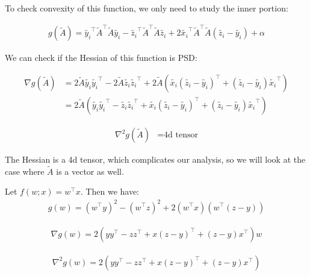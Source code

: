 \documentclass[11pt]{article}
\begin{document}
To check convexity of this function, we only need to study the inner portion:

\begin{equation}
\begin{aligned}
g(\tilde{A}) = \tilde{y_i}^\top\tilde{A}^\top\tilde{A}\tilde{y_i} - \tilde{z_i}^\top\tilde{A}^\top\tilde{A}\tilde{z_i} + 2\tilde{x_i}^\top\tilde{A}^\top\tilde{A}(\tilde{z_i} - \tilde{y_i}) + \alpha
\end{aligned}
\end{equation}

We can check if the Hessian of this function is PSD:

\begin{align*}
\nabla{g(\tilde{A})}
&= 2\tilde{A}\tilde{y_i}\tilde{y_i}^\top - 2\tilde{A}\tilde{z_i}\tilde{z_i}^\top + 2\tilde{A}(\tilde{x_i}(\tilde{z_i} - \tilde{y_i})^\top + (\tilde{z_i} - \tilde{y_i})\tilde{x_i}^\top) \\
&= 2\tilde{A}(\tilde{y_i}\tilde{y_i}^\top - \tilde{z_i}\tilde{z_i}^\top + \tilde{x_i}(\tilde{z_i} - \tilde{y_i})^\top + (\tilde{z_i} - \tilde{y_i})\tilde{x_i}^\top)
\end{align*}

\begin{equation}
\begin{aligned}
\nabla^2 g(\tilde{A})
&= \textrm{4d tensor}
\end{aligned}
\end{equation}

The Hessian is a 4d tensor, which complicates our analysis, so we will look at the case where $\tilde{A}$ is a vector as well. 

Let $f(w; x) = w^{\top}x$. Then we have:
\begin{equation}
\begin{aligned}
g(w) = (w^{\top}y)^2 - (w^{\top}z)^2 + 2(w^{\top}x)(w^{\top}(z - y))
\end{aligned}
\end{equation}

\begin{equation}
\begin{aligned}
\nabla g(w) = 2(yy^{\top} - zz^{\top} + x(z - y)^{\top} + (z - y)x^{\top})w
\end{aligned}
\end{equation}

\begin{equation}
\begin{aligned}
\nabla^2 g(w) = 2(yy^{\top} - zz^{\top} + x(z - y)^{\top} + (z - y)x^{\top})
\end{aligned}
\end{equation}
\end{document}
